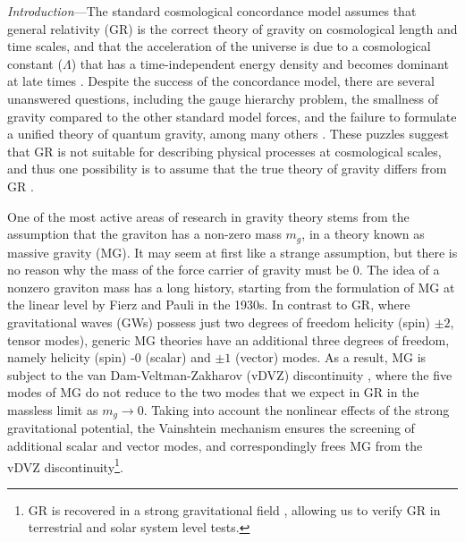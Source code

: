\documentclass[prd,twocolumn,aps,psfig,nofootinbib,nobibnotes,superscriptaddress,preprintnumbers,times]{revtex4-2}
\begin{document}
\maketitle

\textit{Introduction}---The standard cosmological concordance model assumes that general relativity (GR) is the correct theory of gravity on cosmological length and time scales, and that the acceleration of the universe is due to a cosmological constant ($\Lambda$) that has a time-independent energy density and becomes dominant at late times \cite{Dodelson:2020bqr}. %
Despite the success of the concordance model, there are several unanswered questions, including the gauge hierarchy problem, the smallness of gravity compared to the other standard model forces, and the failure to formulate a unified theory of quantum gravity, among many others \cite{Dvali:2013qwe, Moffat:1998vi}. 
These puzzles suggest that GR is not suitable for describing physical processes at cosmological scales, and thus one possibility is to assume that the true theory of gravity differs from GR \cite{deRham:2023byw}. 


One of the most active areas of research in gravity theory stems from the assumption that the graviton has a non-zero mass $m_g$, in a theory known as massive gravity (MG). It may seem at first like a strange assumption, but there is no reason why the mass of the force carrier of gravity must be 0. The idea of a nonzero graviton mass has a long history, starting from the formulation of MG at the linear level by Fierz and Pauli \cite{Fierz:1939ix} in the 1930s. In contrast to GR, where gravitational waves (GWs) possess just two degrees of freedom helicity (spin) $\pm 2$, tensor modes), generic MG theories have an additional three degrees of freedom, namely helicity (spin) -$0$ (scalar) and $\pm 1$ (vector) modes. As a result, MG is subject to the van Dam-Veltman-Zakharov (vDVZ) discontinuity \cite{vanDam:1970vg,Zakharov:1970cc}, where the five modes of MG do not reduce to the two modes that we expect in GR in the massless limit as $m_g \rightarrow 0$. 
Taking into account the nonlinear effects of the strong gravitational potential, the Vainshtein mechanism \cite{Vainshtein:1972sx} ensures the screening of additional scalar and vector modes, and correspondingly frees MG from the vDVZ discontinuity\footnote{GR is recovered in a strong gravitational field \cite{Tasinato:2013rza}, allowing us to verify GR in terrestrial and solar system level tests.}.
\end{document}
